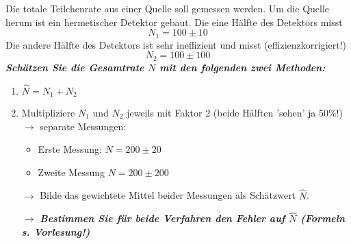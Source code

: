 \begin{slide}
\pagestyle{headings}
\sf
{}
%
\large
%
Die totale Teilchenrate aus einer Quelle soll gemessen werden.
Um die Quelle herum ist ein hermetischer Detektor gebaut.
Die eine H\"alfte des Detektors misst 
\[N_1 = 100 \pm 10\]
Die andere H\"alfte des Detektors ist sehr ineffizient
und misst (effizienzkorrigiert!) 
\[N_2 = 100 \pm 100\]
%
\vspace{2mm}
{\em  \darkgreen \bfseries
Sch\"atzen Sie die Gesamtrate $N$ mit den folgenden zwei Methoden:}
\begin{enumerate}
\item
$ \hat{N} = N_1 + N_2 $
\item
Multipliziere $N_1$ und $N_2$ jeweils mit Faktor 2 
(beide H\"alften 'sehen' ja 50\%!) 
$\rightarrow$ 
separate Messungen:
\begin{itemize}
\item Erste Messung: 
$ N = 200 \pm 20 $
\item Zweite Messung
$ N = 200 \pm 200 $
\end{itemize}
$\rightarrow$ Bilde das gewichtete Mittel beider Messungen
als Sch\"atzwert $\hat{N}$.
\end{enumerate}
%
\vspace{2mm}

\begin{itemize}
\item[$\rightarrow$]
{\em \darkgreen \bfseries Bestimmen Sie f\"ur beide Verfahren den Fehler auf
$\hat{N}$ (Formeln s. Vorlesung!)}
\end{itemize} 
\end{slide}


